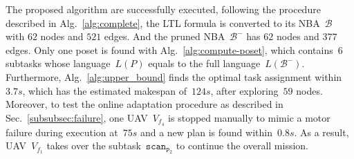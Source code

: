 The proposed algorithm are successfully executed, following the procedure described in Alg.~\ref{alg:complete},
the LTL formula is converted to its NBA~$\mathcal{B}$ with $62$ nodes and $521$ edges.
And the pruned NBA~$\mathcal{B}^-$ has $62$ nodes and $377$ edges.
Only one poset is found with Alg.~\ref{alg:compute-poset},
which contains~$6$ subtasks whose language~$L(P)$ equals to the full language~$L(\mathcal{B}^-)$.
Furthermore, Alg.~\ref{alg:upper_bound} finds the
optimal task assignment within~$3.7s$,
which has the estimated makespan of~$124s$, after exploring~$59$ nodes.
Moreover, to test the online adaptation procedure
as described in Sec.~\ref{subsubsec:failure},
one UAV~$V_{f_4}$ is stopped manually to mimic a motor failure during execution at~$75s$
 and a new plan is found within~$0.8s$.
As a result, UAV~$V_{f_1}$ takes over the subtask~$\texttt{scan}_{\texttt{P}_2}$
to continue the overall mission. 

 

